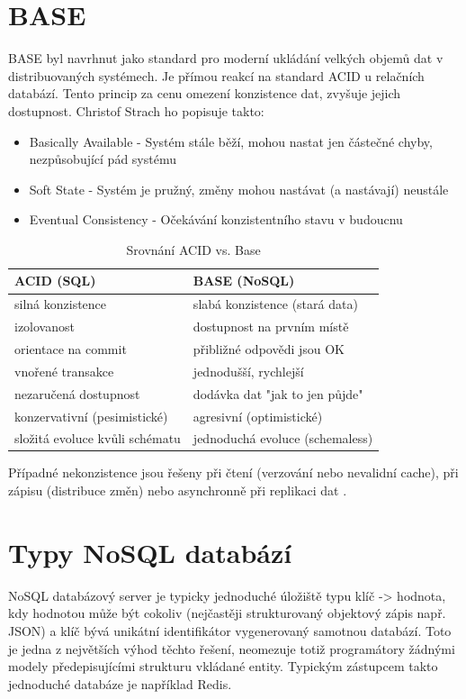 \section{BASE}
BASE byl navrhnut jako standard pro moderní ukládání velkých objemů dat v distribuovaných systémech. Je přímou reakcí na standard ACID u relačních databází. Tento princip za cenu omezení konzistence dat, zvyšuje jejich dostupnost. Christof Strach ho popisuje takto:\cite{strauchNosql}
\begin{itemize}
\item Basically Available - Systém stále běží, mohou nastat jen částečné chyby, nezpůsobující pád systému
\item Soft State - Systém je pružný, změny mohou nastávat (a nastávají) neustále
\item Eventual Consistency - Očekávání konzistentního stavu v budoucnu
\end{itemize}

\vspace{0.25cm}
\FloatBarrier
\begin{table}[h]
\caption{Srovnání ACID vs. Base \cite{nosqlSlides}}
\noindent\begin{tabular}{p{6.5cm} p{6.5cm}}
ACID (SQL) & BASE (NoSQL)\\ \hline
silná konzistence & slabá konzistence (stará data) \\
izolovanost & dostupnost na prvním místě \\
orientace na commit & přibližné odpovědi jsou OK \\
vnořené transakce & jednodušší, rychlejší \\
nezaručená dostupnost & dodávka dat "jak to jen půjde" \\
konzervativní (pesimistické) & agresivní (optimistické) \\
složitá evoluce kvůli schématu & jednoduchá evoluce (schemaless) \\
\end{tabular}

\end{table}
Případné nekonzistence jsou řešeny při čtení (verzování nebo nevalidní cache), při zápisu (distribuce změn) nebo asynchronně při replikaci dat \cite{nosqlSlides}.
\section{Typy NoSQL databází}
NoSQL databázový server je typicky jednoduché úložiště typu klíč -> hodnota, kdy hodnotou může být cokoliv (nejčastěji strukturovaný objektový zápis např. JSON) a klíč bývá unikátní identifikátor vygenerovaný samotnou databází. Toto je jedna z největších výhod těchto řešení, neomezuje totiž programátory žádnými modely předepisujícími strukturu vkládané entity. Typickým zástupcem takto jednoduché databáze je například Redis. 

